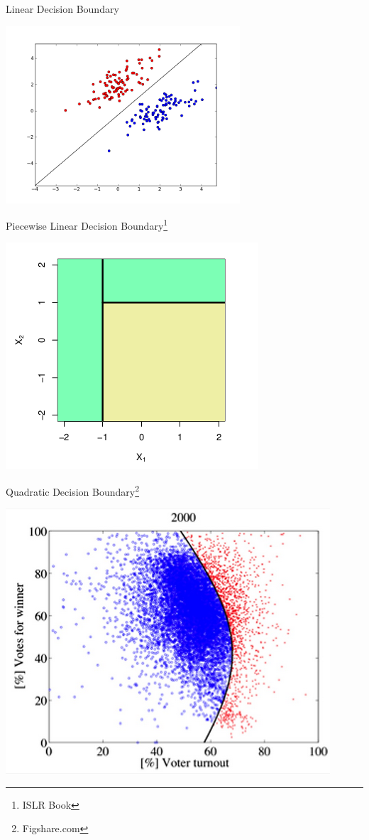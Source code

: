 \documentclass{beamer}
\begin{document}
\begin{frame}{Linear Decision Boundary}
    \begin{center}
        \includegraphics[scale=0.75]{linearDecisionBoundary.png}
    \end{center}
\end{frame}
\begin{frame}{Piecewise Linear Decision Boundary\footnote{ISLR Book}}
    \begin{center}
        \includegraphics[scale=0.6]{piecewiseLinearDecisionBoundary.png}
    \end{center}
\end{frame}
\begin{frame}{Quadratic Decision Boundary\footnote{Figshare.com}}
    \begin{center}
        \includegraphics[scale=0.5]{quadraticDecisionBoundary.png}
    \end{center}
\end{frame}
\end{document}
